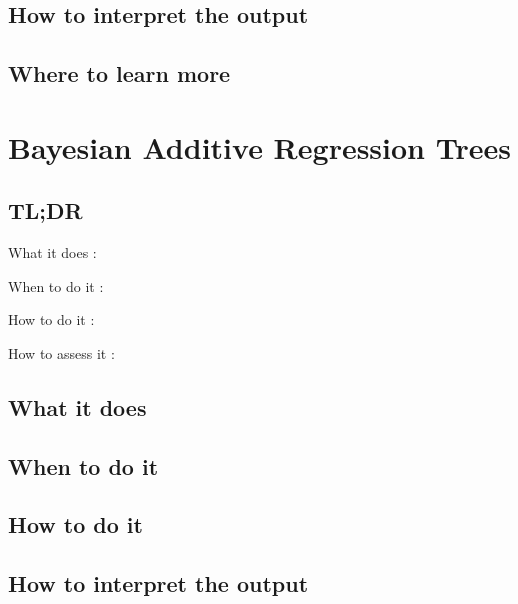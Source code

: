 \documentclass[
]{book}
\begin{document}
\hypertarget{how-to-interpret-the-output-18}{%
\section{How to interpret the output}\label{how-to-interpret-the-output-18}}

\hypertarget{where-to-learn-more-18}{%
\section{Where to learn more}\label{where-to-learn-more-18}}

\hypertarget{bayesian-additive-regression-trees}{%
\chapter{Bayesian Additive Regression Trees}\label{bayesian-additive-regression-trees}}

\hypertarget{tldr-19}{%
\section{TL;DR}\label{tldr-19}}

What it does
:

When to do it
:

How to do it
:

How to assess it
:

\hypertarget{what-it-does-19}{%
\section{What it does}\label{what-it-does-19}}

\hypertarget{when-to-do-it-19}{%
\section{When to do it}\label{when-to-do-it-19}}

\hypertarget{how-to-do-it-19}{%
\section{How to do it}\label{how-to-do-it-19}}

\hypertarget{how-to-interpret-the-output-19}{%
\section{How to interpret the output}\label{how-to-interpret-the-output-19}}
\end{document}
